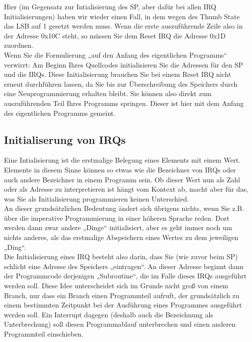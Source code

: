 Hier (im Gegensatz zur Intialisierung des SP, aber dafür bei allen IRQ Initialisierungen) haben wir wieder einen Fall, in dem wegen des Thumb State das LSB auf 1 gesetzt werden muss. Wenn die erste auszuführende Zeile also in der Adresse 0x10C steht, so müssen Sie dem Reset IRQ die Adresse 0x1D zuordnen. \\

Wenn Sie die Formulierung „auf den Anfang des eigentlichen Programms“ verwirrt: Am Beginn Ihres Quellcodes initialisieren Sie die Adressen für den SP und die IRQs. Diese Initialisierung brauchen Sie bei einem Reset IRQ nicht erneut durchführen lassen, da Sie bis zur Überschreibung des Speichers durch eine Neuprogrammierung erhalten bleibt. Sie können also direkt zum auszuführenden Teil Ihres Programms springen. Dieser ist hier mit dem Anfang des eigentlichen Programms gemeint.

\subsection{Initialiserung von IRQs}

Eine Intialisierung ist die erstmalige Belegung eines Elements mit einem Wert. Elemente in diesem Sinne können so etwas wie die Bezeichner von IRQs oder auch andere Bezeichner in einem Programm sein. Ob dieser Wert nun als Zahl oder als Adresse zu interpretieren ist hängt vom Kontext ab, macht aber für das, was Sie als Initialisierung programmieren keinen Unterschied.\\

An dieser grundsätzlichen Bedeutung ändert sich übrigens nichts, wenn Sie z.B. über die imperative Programmierung in einer höheren Sprache reden. Dort werden dann zwar andere „Dinge“ initialisiert, aber es geht immer noch um nichts anderes, als das erstmalige Abspeichern eines Wertes zu dem jeweiligen „Ding“.\\

Die Initialisierung eines IRQ besteht also darin, dass Sie (wie zuvor beim SP) schlicht eine Adresse des Speichers „eintragen“. An dieser Adresse beginnt dann der Programmcode derjenigen „Subroutine“, die im Falle dieses IRQs ausgeführt werden soll. Diese Idee unterscheidet sich im Grunde nicht groß von einem Branch, nur dass ein Branch einen Programmteil aufruft, der grundsätzlich zu einem bestimmten Zeitpunkt bei der Ausführung eines Programmes ausgeführt werden soll. Ein Interrupt dagegen (deshalb auch die Bezeichnung als Unterbrechung) soll diesen Programmablauf unterbrechen und einen anderen Programmteil einschieben.\\

